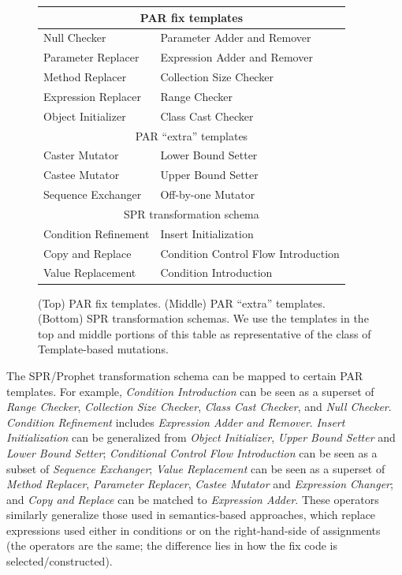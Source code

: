 \documentclass[conference]{IEEEtran}
\begin{document}
\begin{figure}[ht]
  \centering
{\small
\begin{tabular}{ll}
\toprule
\multicolumn{2}{c}{PAR fix templates} \\
\midrule
Null Checker & Parameter Adder and Remover \\ 
Parameter Replacer & Expression Adder and Remover \\  
Method Replacer & Collection Size Checker \\
Expression Replacer &  Range Checker\\
Object Initializer & Class Cast Checker\\
\midrule
\multicolumn{2}{c}{PAR ``extra'' templates} \\
\midrule
Caster Mutator & Lower Bound Setter  \\
Castee Mutator & Upper Bound Setter  \\
Sequence Exchanger & Off-by-one Mutator\\
\midrule
\multicolumn{2}{c}{SPR transformation schema} \\
\midrule
Condition Refinement & Insert Initialization \\
Copy and Replace & Condition Control Flow Introduction  \\
Value Replacement  & Condition Introduction \\
\bottomrule
\end{tabular}
}
  \caption{(Top) PAR fix templates. (Middle) PAR ``extra'' templates. (Bottom)
    SPR transformation schemas. We use the templates in the top and middle
    portions of this table as representative of the class of Template-based mutations. \label{approachTemplates}}
\end{figure}

The SPR/Prophet transformation schema can be mapped to certain PAR 
templates. For example, \emph{Condition Introduction} can be seen as a superset of 
\emph{Range Checker}, \emph{Collection Size 
Checker}, \emph{Class Cast Checker}, and \emph{Null Checker}. \emph{Condition Refinement} includes \emph{Expression Adder and Remover}. \emph{Insert Initialization} can be 
generalized from \emph{Object Initializer}, \emph{Upper Bound Setter} and \emph{Lower Bound Setter}; \emph{Conditional Control Flow Introduction} can be 
seen as a subset of \emph{Sequence Exchanger};
\emph{Value Replacement} can be seen as a superset of \emph{Method 
Replacer}, \emph{Parameter Replacer}, \emph{Castee Mutator} and \emph{Expression Changer}; and \emph{Copy 
and Replace} can be matched to \emph{Expression Adder}. 
These operators similarly generalize those used in semantics-based approaches,
which replace expressions used either in conditions or on the right-hand-side of
assignments (the operators are the same; the difference lies in how the fix code
is selected/constructed). 
\end{document}

